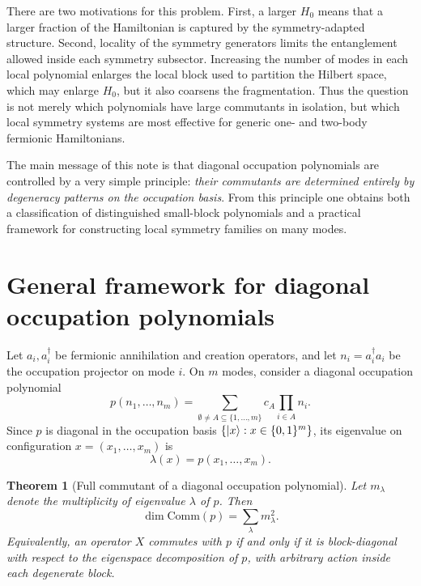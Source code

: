 \documentclass[11pt]{article}
\newcommand{\Comm}{\mathrm{Comm}}
\newtheorem{theorem}{Theorem}[section]
\theoremstyle{definition}
\theoremstyle{remark}
\begin{document}
There are two motivations for this problem. First, a larger $H_0$ means that a larger fraction of the Hamiltonian is captured by the symmetry-adapted structure. Second, locality of the symmetry generators limits the entanglement allowed inside each symmetry subsector. Increasing the number of modes in each local polynomial enlarges the local block used to partition the Hilbert space, which may enlarge $H_0$, but it also coarsens the fragmentation. Thus the question is not merely which polynomials have large commutants in isolation, but which local symmetry systems are most effective for generic one- and two-body fermionic Hamiltonians.

The main message of this note is that diagonal occupation polynomials are controlled by a very simple principle: \emph{their commutants are determined entirely by degeneracy patterns on the occupation basis}. From this principle one obtains both a classification of distinguished small-block polynomials and a practical framework for constructing local symmetry families on many modes.

\section{General framework for diagonal occupation polynomials}
Let $a_i,a_i^\dagger$ be fermionic annihilation and creation operators, and let $n_i=a_i^\dagger a_i$ be the occupation projector on mode $i$. On $m$ modes, consider a diagonal occupation polynomial
\begin{equation}
  p(n_1,\dots,n_m)=\sum_{\emptyset\neq A\subseteq \{1,\dots,m\}} c_A \prod_{i\in A} n_i.
\end{equation}
Since $p$ is diagonal in the occupation basis $\{\ket{x}:x\in\{0,1\}^m\}$, its eigenvalue on configuration $x=(x_1,\dots,x_m)$ is
\begin{equation}
  \lambda(x)=p(x_1,\dots,x_m).
\end{equation}

\begin{theorem}[Full commutant of a diagonal occupation polynomial]
Let $m_\lambda$ denote the multiplicity of eigenvalue $\lambda$ of $p$. Then
\begin{equation}
  \dim \Comm(p)=\sum_\lambda m_\lambda^2.
\end{equation}
Equivalently, an operator $X$ commutes with $p$ if and only if it is block-diagonal with respect to the eigenspace decomposition of $p$, with arbitrary action inside each degenerate block.
\end{theorem}
\end{document}
